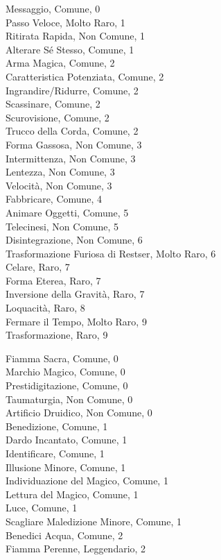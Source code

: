 \begin{multicols}{3}
Messaggio, Comune, 0\\
Passo Veloce, Molto Raro, 1\\
Ritirata Rapida, Non Comune, 1\\
Alterare Sé Stesso, Comune, 1\\
Arma Magica, Comune, 2\\
Caratteristica Potenziata, Comune, 2\\
Ingrandire/Ridurre, Comune, 2\\
Scassinare, Comune, 2\\
Scurovisione, Comune, 2\\
Trucco della Corda, Comune, 2\\
Forma Gassosa, Non Comune, 3\\
Intermittenza, Non Comune, 3\\
Lentezza, Non Comune, 3\\
Velocità, Non Comune, 3\\
Fabbricare, Comune, 4\\
Animare Oggetti, Comune, 5\\
Telecinesi, Non Comune, 5\\
Disintegrazione, Non Comune, 6\\
Trasformazione Furiosa di Restser, Molto Raro, 6\\
Celare, Raro, 7\\
Forma Eterea, Raro, 7\\
Inversione della Gravità, Raro, 7\\
Loquacità, Raro, 8\\
Fermare il Tempo, Molto Raro, 9\\
Trasformazione, Raro, 9\\


Fiamma Sacra, Comune, 0\\
Marchio Magico, Comune, 0\\
Prestidigitazione, Comune, 0\\
Taumaturgia, Non Comune, 0\\
Artificio Druidico, Non Comune, 0\\
Benedizione, Comune, 1\\
Dardo Incantato, Comune, 1\\
Identificare, Comune, 1\\
Illusione Minore, Comune, 1\\
Individuazione del Magico, Comune, 1\\
Lettura del Magico, Comune, 1\\
Luce, Comune, 1\\
Scagliare Maledizione Minore, Comune, 1\\
Benedici Acqua, Comune, 2\\
Fiamma Perenne, Leggendario, 2\\

\end{multicols}